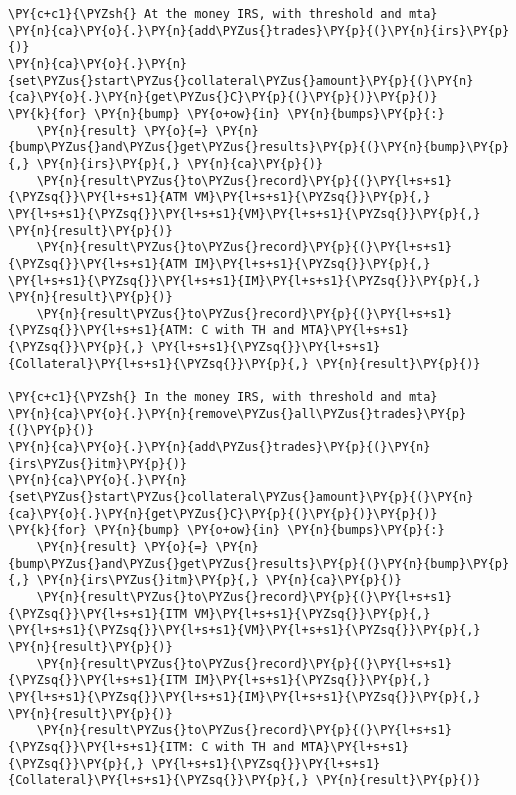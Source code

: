     \begin{tcolorbox}[breakable, size=fbox, boxrule=1pt, pad at break*=1mm,colback=cellbackground, colframe=cellborder]
\begin{Verbatim}[commandchars=\\\{\}]
\PY{c+c1}{\PYZsh{} At the money IRS, with threshold and mta}
\PY{n}{ca}\PY{o}{.}\PY{n}{add\PYZus{}trades}\PY{p}{(}\PY{n}{irs}\PY{p}{)}
\PY{n}{ca}\PY{o}{.}\PY{n}{set\PYZus{}start\PYZus{}collateral\PYZus{}amount}\PY{p}{(}\PY{n}{ca}\PY{o}{.}\PY{n}{get\PYZus{}C}\PY{p}{(}\PY{p}{)}\PY{p}{)}
\PY{k}{for} \PY{n}{bump} \PY{o+ow}{in} \PY{n}{bumps}\PY{p}{:}
    \PY{n}{result} \PY{o}{=} \PY{n}{bump\PYZus{}and\PYZus{}get\PYZus{}results}\PY{p}{(}\PY{n}{bump}\PY{p}{,} \PY{n}{irs}\PY{p}{,} \PY{n}{ca}\PY{p}{)}
    \PY{n}{result\PYZus{}to\PYZus{}record}\PY{p}{(}\PY{l+s+s1}{\PYZsq{}}\PY{l+s+s1}{ATM VM}\PY{l+s+s1}{\PYZsq{}}\PY{p}{,} \PY{l+s+s1}{\PYZsq{}}\PY{l+s+s1}{VM}\PY{l+s+s1}{\PYZsq{}}\PY{p}{,} \PY{n}{result}\PY{p}{)}
    \PY{n}{result\PYZus{}to\PYZus{}record}\PY{p}{(}\PY{l+s+s1}{\PYZsq{}}\PY{l+s+s1}{ATM IM}\PY{l+s+s1}{\PYZsq{}}\PY{p}{,} \PY{l+s+s1}{\PYZsq{}}\PY{l+s+s1}{IM}\PY{l+s+s1}{\PYZsq{}}\PY{p}{,} \PY{n}{result}\PY{p}{)}
    \PY{n}{result\PYZus{}to\PYZus{}record}\PY{p}{(}\PY{l+s+s1}{\PYZsq{}}\PY{l+s+s1}{ATM: C with TH and MTA}\PY{l+s+s1}{\PYZsq{}}\PY{p}{,} \PY{l+s+s1}{\PYZsq{}}\PY{l+s+s1}{Collateral}\PY{l+s+s1}{\PYZsq{}}\PY{p}{,} \PY{n}{result}\PY{p}{)}

\PY{c+c1}{\PYZsh{} In the money IRS, with threshold and mta}
\PY{n}{ca}\PY{o}{.}\PY{n}{remove\PYZus{}all\PYZus{}trades}\PY{p}{(}\PY{p}{)}
\PY{n}{ca}\PY{o}{.}\PY{n}{add\PYZus{}trades}\PY{p}{(}\PY{n}{irs\PYZus{}itm}\PY{p}{)}
\PY{n}{ca}\PY{o}{.}\PY{n}{set\PYZus{}start\PYZus{}collateral\PYZus{}amount}\PY{p}{(}\PY{n}{ca}\PY{o}{.}\PY{n}{get\PYZus{}C}\PY{p}{(}\PY{p}{)}\PY{p}{)}
\PY{k}{for} \PY{n}{bump} \PY{o+ow}{in} \PY{n}{bumps}\PY{p}{:}
    \PY{n}{result} \PY{o}{=} \PY{n}{bump\PYZus{}and\PYZus{}get\PYZus{}results}\PY{p}{(}\PY{n}{bump}\PY{p}{,} \PY{n}{irs\PYZus{}itm}\PY{p}{,} \PY{n}{ca}\PY{p}{)}
    \PY{n}{result\PYZus{}to\PYZus{}record}\PY{p}{(}\PY{l+s+s1}{\PYZsq{}}\PY{l+s+s1}{ITM VM}\PY{l+s+s1}{\PYZsq{}}\PY{p}{,} \PY{l+s+s1}{\PYZsq{}}\PY{l+s+s1}{VM}\PY{l+s+s1}{\PYZsq{}}\PY{p}{,} \PY{n}{result}\PY{p}{)}
    \PY{n}{result\PYZus{}to\PYZus{}record}\PY{p}{(}\PY{l+s+s1}{\PYZsq{}}\PY{l+s+s1}{ITM IM}\PY{l+s+s1}{\PYZsq{}}\PY{p}{,} \PY{l+s+s1}{\PYZsq{}}\PY{l+s+s1}{IM}\PY{l+s+s1}{\PYZsq{}}\PY{p}{,} \PY{n}{result}\PY{p}{)}
    \PY{n}{result\PYZus{}to\PYZus{}record}\PY{p}{(}\PY{l+s+s1}{\PYZsq{}}\PY{l+s+s1}{ITM: C with TH and MTA}\PY{l+s+s1}{\PYZsq{}}\PY{p}{,} \PY{l+s+s1}{\PYZsq{}}\PY{l+s+s1}{Collateral}\PY{l+s+s1}{\PYZsq{}}\PY{p}{,} \PY{n}{result}\PY{p}{)}


\end{Verbatim}
\end{tcolorbox}
